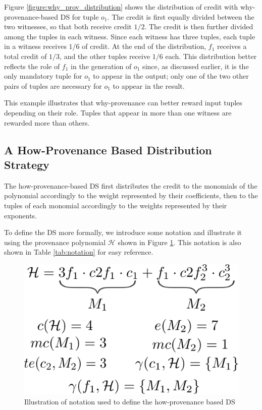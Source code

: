Figure \ref{figure:why_prov_distribution} shows the distribution of credit with why-provenance-based DS for tuple $o_1$.
The credit is first equally divided between the two witnesses, so that both receive credit $1/2$. 
The credit is then further divided among the tuples in each witness. Since each witness has three tuples, each tuple in a witness receives $1/6$ of credit. At the end of the distribution, $f_1$ receives a total credit of $1/3$, and the other tuples receive $1/6$ each.
This distribution better reflects the role of $f_1$ in the generation of $o_1$ since, as discussed earlier, it is the only mandatory tuple for $o_1$ to appear in the output; only one of the two other pairs of tuples are necessary for $o_1$ to appear in the result. 

This example illustrates that why-provenance can better reward input tuples depending on their role. Tuples that appear in more than one witness are rewarded more than others. 

\subsection{A How-Provenance Based Distribution Strategy}
\label{section:how_prov_distr_tuples}



The how-provenance-based DS first distributes the credit to the monomials of the polynomial accordingly to the weight represented by their coefficients, then to the tuples of each monomial accordingly to the weights represented by their exponents. 

To define the DS more formally, we introduce some notation and illustrate it using the provenance polynomial $\mathcal{H}$ shown in Figure \ref{figure:how_example}. This notation is also shown  in Table \ref{tab:notation} for easy reference.


\begin{figure}[]
\centering
  \includegraphics[width=.4\textwidth]{figures/how_example}
  \caption{Illustration of notation used to define the how-provenance based DS } %
  \label{figure:how_example}
\end{figure}

